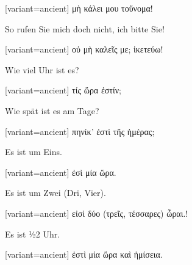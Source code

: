 \begin{greek}[variant=ancient]%
μὴ κάλει μου τοὔνομα!

\end{greek}%
\switchcolumn*

So rufen Sie mich doch nicht, ich bitte Sie!

\switchcolumn

\begin{greek}[variant=ancient]%
οὐ μὴ καλεῖς με; ἱκετεύω!

\end{greek}%
\indent Wie viel Uhr ist es?

\switchcolumn

\begin{greek}[variant=ancient]%
τίς ὥρα ἐστίν;

\end{greek}%
\switchcolumn*

Wie spät ist es am Tage?

\switchcolumn

\begin{greek}[variant=ancient]%
πηνίκ' ἐστὶ τῆς ἡμέρας;

\end{greek}%
\switchcolumn*

Es ist um Eins.

\switchcolumn

\begin{greek}[variant=ancient]%
ἐσὶ μία ὥρα.

\end{greek}%
\switchcolumn*

Es ist um Zwei (Dri, Vier).

\switchcolumn

\begin{greek}[variant=ancient]%
εἰσὶ δύο (τρεῖς, τέσσαρες) ὦραι.!

\end{greek}%
\switchcolumn*

Es ist ½2 Uhr.

\switchcolumn

\begin{greek}[variant=ancient]%
ἐστὶ μία ὥρα καὶ ἡμίσεια.

\end{greek}%
\switchcolumn*

